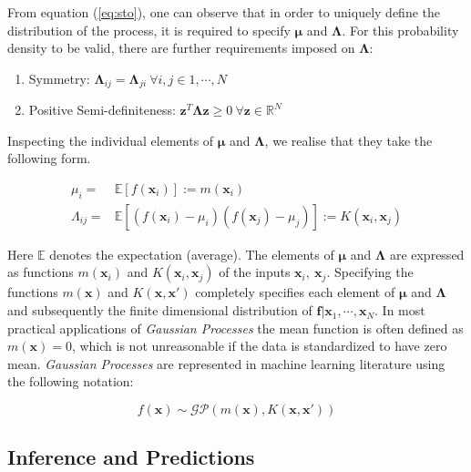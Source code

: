 \documentclass[draft,sw]{AGUTeX}
\begin{document}
\begin{article}
From equation (\ref{eq:sto}), one can observe that in order to uniquely define the distribution of the process, it is required to specify $\mathbf{\mu}$ and $\mathbf{\Lambda}$. For this probability density to be valid, there are further requirements imposed on $\mathbf{\Lambda}$: 

\begin{enumerate}
      \item Symmetry: $\mathbf{\Lambda}_{ij} = \mathbf{\Lambda}_{ji} \ \forall i,j \in {1, \cdots, N} $ 
      \item Positive Semi-definiteness: $\mathbf{z}^T \mathbf{\Lambda} \mathbf{z} \geq 0 \ \forall \mathbf{z} \in \mathbb{R}^N$  
\end{enumerate}

Inspecting the individual elements of $\mathbf{\mu}$ and $\mathbf{\Lambda}$, we realise that they take the following form.

\begin{align}
      \mu_i = & \mathbb{E}[f(\mathbf{x}_i)] := m(\mathbf{x}_i) \\
      \Lambda_{ij} = & \mathbb{E}[(f(\mathbf{x}_i) - \mu_i)(f(\mathbf{x}_j) - \mu_j)] := K(\mathbf{x}_i, \mathbf{x}_j)
\end{align}

Here $\mathbb{E}$ denotes the expectation (average). The elements of $\mathbf{\mu}$ and $\mathbf{\Lambda}$ are expressed as functions $m(\mathbf{x}_i)$ and $K(\mathbf{x}_i, \mathbf{x}_j)$ of the inputs $\mathbf{x}_i,\ \mathbf{x}_j$. Specifying the functions $m(\mathbf{x})$ and $K(\mathbf{x}, \mathbf{x}')$ completely specifies each element of $\mathbf{\mu}$ and $\mathbf{\Lambda}$ and subsequently the finite dimensional distribution of $\mathbf{f} | \mathbf{x}_1, \cdots, \mathbf{x}_N $. In most practical applications of \emph{Gaussian Processes} the mean function is often defined as $m(\mathbf{x}) = 0$, which is not unreasonable if the data is standardized to have zero mean. \emph{Gaussian Processes} are represented in machine learning literature using the following notation:

\begin{equation}
    f(\mathbf{x}) \sim \mathcal{GP}(m(\mathbf{x}), K(\mathbf{x}, \mathbf{x}'))
\end{equation}

\subsection{Inference and Predictions} \label{sec:inference}


\end{article}
\end{document}
